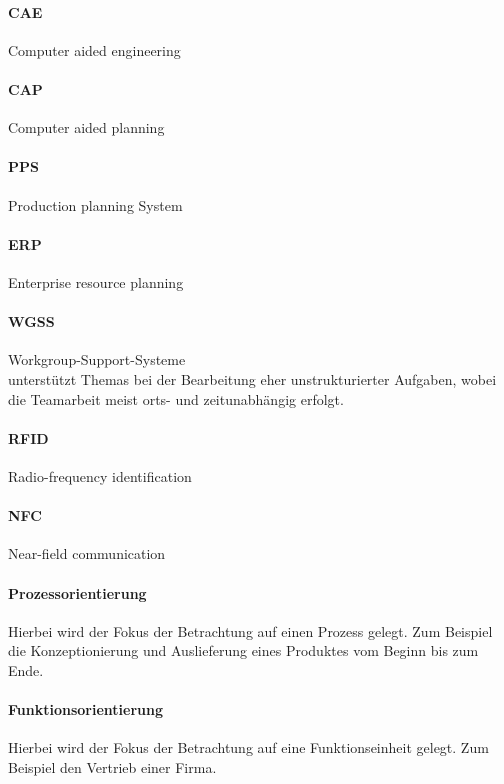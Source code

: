 \documentclass[twocolumn]{article}
\begin{document}
\paragraph{CAE}
	Computer aided engineering

\paragraph{CAP}
	Computer aided planning

\paragraph{PPS}
	Production planning System

\paragraph{ERP}
	Enterprise resource planning

\paragraph{WGSS}
	 Workgroup-Support-Systeme \\
	 unterstützt Themas bei der Bearbeitung eher unstrukturierter Aufgaben, wobei die Teamarbeit meist orts- und zeitunabhängig erfolgt.

\paragraph{RFID}
	Radio-frequency identification

\paragraph{NFC}
	Near-field communication
\paragraph{Prozessorientierung}
	Hierbei wird der Fokus der Betrachtung auf einen Prozess gelegt. Zum Beispiel die Konzeptionierung und Auslieferung eines Produktes vom Beginn bis zum Ende. 

\paragraph{Funktionsorientierung}
	Hierbei wird der Fokus der Betrachtung auf eine Funktionseinheit gelegt. Zum Beispiel den Vertrieb einer Firma.
\end{document}
